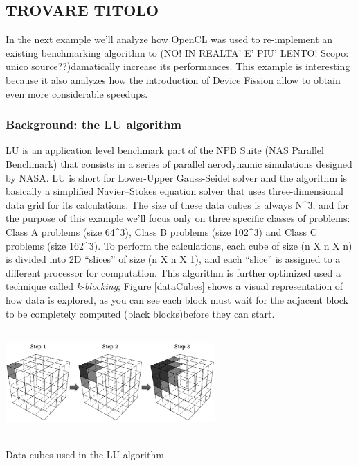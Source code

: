 
\subsection{TROVARE TITOLO}

In the next example \cite{Pennycook2012} we'll analyze how OpenCL was used to re-implement an existing benchmarking algorithm to (NO! IN REALTA' E' PIU' LENTO! Scopo: unico source??)damatically increase its performances. This example is interesting because it also analyzes how the introduction of Device Fission allow to obtain even more considerable speedups.

\subsubsection{Background: the LU algorithm}

LU is an application level benchmark part of the NPB Suite (NAS Parallel Benchmark) that consists in a series of parallel aerodynamic simulations designed by NASA. LU is short for Lower-Upper Gauss-Seidel solver and the algorithm is basically a simplified Navier–Stokes equation solver that uses three-dimensional data grid for its calculations. The size of these data cubes is always N^3, and for the purpose of this example we'll focus only on three specific classes of problems: Class A problems (size 64^3), Class B problems (size 102^3) and Class C problems (size 162^3).
To perform the calculations, each cube of size (n X n X n) is divided into 2D "`slices"' of size (n X n X 1), and each "`slice"' is assigned to a different processor for computation. This algorithm is further optimized used a technique called \textit{k-blocking}; Figure \ref{dataCubes} shows a visual representation of how data is explored, as you can see each block must wait for the adjacent block to be completely computed (black blocks)before they can start.

\begin{figurehere}
 \centering
 \includegraphics[width=8cm, height=4cm]{./eps/dataCube.eps}
 \caption{Data cubes used in the LU algorithm}
 \label{fig:dataCubes}
\end{figurehere}


